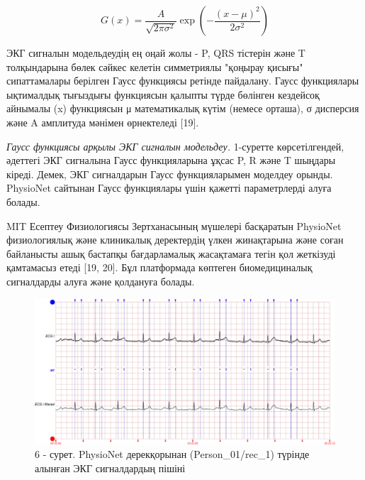 \begin{equation}
    G(x) = \frac{A}{\sqrt{2\pi\sigma^{2}}}\exp\left( - \frac{(x - \mu)^{2}}{2\sigma^{2}} \right)
\end{equation}

\begin{multicols}{2}
ЭКГ сигналын модельдеудің ең оңай жолы - P, QRS тістерін және T
толқындарына бөлек сәйкес келетін симметриялы "қоңырау қисығы"
сипаттамалары берілген Гаусс функциясы ретінде пайдалану. Гаусс
функциялары ықтималдық тығыздығы функциясын қалыпты түрде бөлінген
кездейсоқ айнымалы (x) функциясын μ математикалық күтім (немесе орташа),
σ дисперсия және A амплитуда мәнімен өрнектеледі {[}19{]}.

\emph{Гаусс функциясы арқылы ЭКГ сигналын модельдеу.} 1-суретте
көрсетілгендей, әдеттегі ЭКГ сигналына Гаусс функцияларына ұқсас P, R
және T шыңдары кіреді. Демек, ЭКГ сигналдарын Гаусс функцияларымен
моделдеу орынды. PhysioNet сайтынан Гаусс функциялары үшін қажетті
параметрлерді алуға болады.

MIT Есептеу Физиологиясы Зертханасының мүшелері басқаратын PhysioNet
физиологиялық және клиникалық деректердің үлкен жинақтарына және соған
байланысты ашық бастапқы бағдарламалық жасақтамаға тегін қол жеткізуді
қамтамасыз етеді {[}19, 20{]}. Бұл платформада көптеген биомедициналық
сигналдарды алуға және қолдануға болады.
\end{multicols}

\begin{figure}[H]
	\centering
	\includegraphics[width=\textwidth]{media/ict/image45}
	\caption*{6 - сурет. PhysioNet дерекқорынан (Person\_01/rec\_1) түрінде алынған ЭКГ сигналдардың пішіні}
\end{figure}

